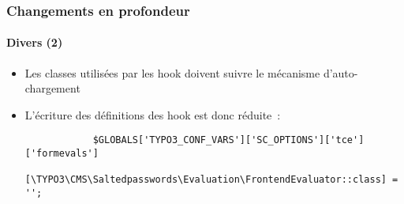 \begin{frame}[fragile]
	\frametitle{Changements en profondeur}
	\framesubtitle{Divers (2)}

	\lstset{basicstyle=\tiny\ttfamily}

	\begin{itemize}

		\item Les classes utilisées par les hook doivent suivre le mécanisme d'auto-chargement
		\item L'écriture des définitions des hook est donc réduite~:

		\begin{lstlisting}
			$GLOBALS['TYPO3_CONF_VARS']['SC_OPTIONS']['tce']['formevals']
			  [\TYPO3\CMS\Saltedpasswords\Evaluation\FrontendEvaluator::class] = '';
		\end{lstlisting}

	\end{itemize}

	\breakingchange

\end{frame}

